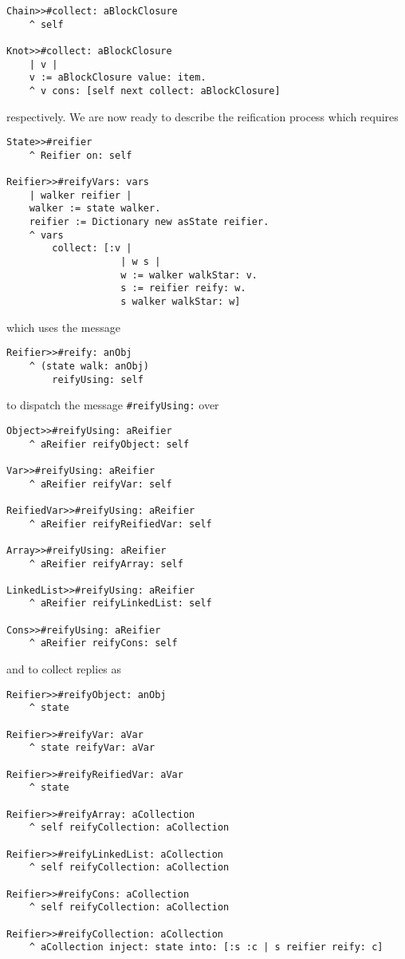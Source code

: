 \documentclass[a4paper,12pt]{article}
\begin{document}
\begin{verbatim}
Chain>>#collect: aBlockClosure
    ^ self

Knot>>#collect: aBlockClosure
    | v |
    v := aBlockClosure value: item.
    ^ v cons: [self next collect: aBlockClosure]
\end{verbatim}
respectively.  We are now ready to describe the reification process which
requires
\begin{verbatim}
State>>#reifier
    ^ Reifier on: self

Reifier>>#reifyVars: vars
    | walker reifier |
    walker := state walker.
    reifier := Dictionary new asState reifier.
    ^ vars
        collect: [:v |
                    | w s |
                    w := walker walkStar: v.
                    s := reifier reify: w.
                    s walker walkStar: w]
\end{verbatim}
which uses the message
\begin{verbatim}
Reifier>>#reify: anObj 
    ^ (state walk: anObj) 
        reifyUsing: self
\end{verbatim}
to dispatch the message \Verb|#reifyUsing:| over
\begin{verbatim}
Object>>#reifyUsing: aReifier
    ^ aReifier reifyObject: self 

Var>>#reifyUsing: aReifier 
    ^ aReifier reifyVar: self 

ReifiedVar>>#reifyUsing: aReifier 
    ^ aReifier reifyReifiedVar: self

Array>>#reifyUsing: aReifier
    ^ aReifier reifyArray: self 

LinkedList>>#reifyUsing: aReifier 
    ^ aReifier reifyLinkedList: self 

Cons>>#reifyUsing: aReifier 
    ^ aReifier reifyCons: self 
\end{verbatim}
and to collect replies as
\begin{verbatim}
Reifier>>#reifyObject: anObj 
    ^ state

Reifier>>#reifyVar: aVar 
    ^ state reifyVar: aVar

Reifier>>#reifyReifiedVar: aVar 
    ^ state

Reifier>>#reifyArray: aCollection 
    ^ self reifyCollection: aCollection

Reifier>>#reifyLinkedList: aCollection 
    ^ self reifyCollection: aCollection

Reifier>>#reifyCons: aCollection 
    ^ self reifyCollection: aCollection

Reifier>>#reifyCollection: aCollection 
    ^ aCollection inject: state into: [:s :c | s reifier reify: c]
\end{verbatim}
\end{document}
